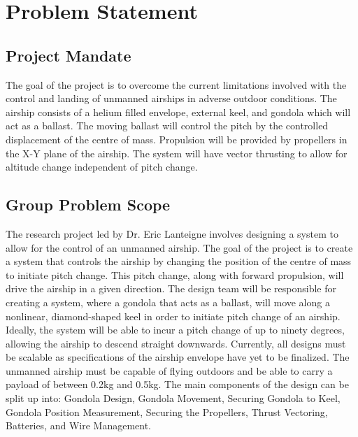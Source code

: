 \documentclass[12pt]{article}
\begin{document}
  \printnomenclature
\pagebreak

\pagestyle{fancy}
\setlength{\headheight}{14.5pt} 
\fancyhf{}
\rhead{\rightmark}
\cfoot{\thepage}

\section{Problem Statement}

\subsection{Project Mandate} \label{Mandate}
The goal of the project is to overcome the current limitations involved with the control and landing of unmanned airships in adverse outdoor conditions. The airship consists of a helium filled envelope, external keel, and gondola which will act as a ballast. The moving ballast will control the pitch by the controlled displacement of the centre of mass. Propulsion will be provided by propellers in the X-Y plane of the airship. The system will have vector thrusting to allow for altitude change independent of pitch change.

\subsection{Group Problem Scope} \label{Scope}
The research project led by Dr. Eric Lanteigne involves designing a system to allow for the control of an unmanned airship. The goal of the project is to create a system that controls the airship by changing the position of the centre of mass to initiate pitch change. This pitch change, along with forward propulsion, will drive the airship in a given direction. The design team will be responsible for creating a system, where a gondola that acts as a ballast, will move along a nonlinear, diamond-shaped keel in order to initiate pitch change of an airship. Ideally, the system will be able to incur a pitch change of up to ninety degrees, allowing the airship to descend straight downwards. Currently, all designs must be scalable as specifications of the airship envelope have yet to be finalized. The unmanned airship must be capable of flying outdoors and be able to carry a payload of between 0.2kg and 0.5kg. The main components of the design can be split up into: Gondola Design, Gondola Movement, Securing Gondola to Keel, Gondola Position Measurement, Securing the Propellers, Thrust Vectoring, Batteries, and Wire Management.
\end{document}
